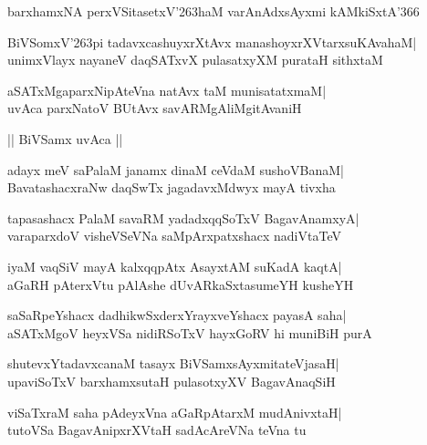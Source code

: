 \documentclass[twoside,12pt,openright]{book}
\def\S{\char'263}
\newcounter{shloka}[chapter]
\begin{document}
\begin{shloka}%
barxhamxNA perxVSitasetxV\S haM varAnAdxsAyxmi kAMkiSxtA\char'366
\end{shloka}

\begin{shloka}%
BiVSomxV\S pi tadavxcashuyxrXtAvx manashoyxrXVtarxsuKAvahaM|\\
unimxVlayx nayaneV daqSATxvX pulasatxyXM purataH sithxtaM
\end{shloka}

\begin{shloka}%
aSATxMgaparxNipAteVna natAvx taM munisatatxmaM|\\
uvAca parxNatoV BUtAvx savARMgAliMgitAvaniH
\end{shloka}

\begin{center}
|| BiVSamx uvAca ||
\end{center}
\begin{shloka}%
adayx meV saPalaM janamx dinaM ceVdaM sushoVBanaM|\\
BavatashacxraNw daqSwTx jagadavxMdwyx mayA tivxha
\end{shloka}

\begin{shloka}%
tapasashacx PalaM savaRM yadadxqqSoTxV BagavAnamxyA|\\
varaparxdoV visheVSeVNa saMpArxpatxshacx nadiVtaTeV
\end{shloka}

\begin{shloka}%
iyaM vaqSiV mayA kalxqqpAtx AsayxtAM suKadA kaqtA|\\
aGaRH pAterxVtu pAlAshe dUvARkaSxtasumeYH kusheYH
\end{shloka}

\begin{shloka}%
saSaRpeYshacx dadhikwSxderxYrayxveYshacx payasA saha|\\
aSATxMgoV heyxVSa nidiRSoTxV hayxGoRV hi muniBiH purA
\end{shloka}

\begin{shloka}%
shutevxYtadavxcanaM tasayx BiVSamxsAyxmitateVjasaH|\\
upaviSoTxV barxhamxsutaH pulasotxyXV BagavAnaqSiH
\end{shloka}

\begin{shloka}%
viSaTxraM saha pAdeyxVna aGaRpAtarxM mudAnivxtaH|\\
tutoVSa BagavAnipxrXVtaH sadAcAreVNa teVna tu
\end{shloka}
\end{document}
